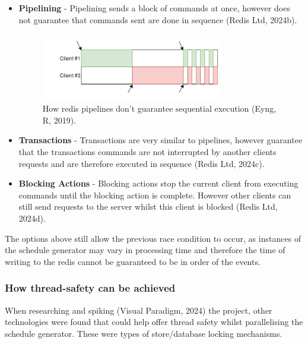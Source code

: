   \begin{itemize}
    \item \textbf{Pipelining} - Pipelining sends a block of commands at once, however does not guarantee that commands sent are done in sequence 
    (Redis Ltd, 2024b).
    \begin{figure}[H]
      \centering
      \includegraphics[width=8cm]{assets/pipelineOrdering.png}
      \caption{How redis pipelines don't guarantee sequential execution (Eyng, R, 2019).}
      \label{fig:pipelineOrdering}
    \end{figure}
    \item \textbf{Transactions} - Transactions are very similar to pipelines, however guarantee that the transactions commands are not interrupted by another
    clients requests and are therefore executed in sequence (Redis Ltd, 2024c).
    \item \textbf{Blocking Actions} - Blocking actions stop the current client from executing commands until the blocking action is complete. However other 
    clients can still send requests to the server whilst this client is blocked (Redis Ltd, 2024d). 
  \end{itemize}

  The options above still allow the previous race condition to occur, as instances of the schedule generator may vary in processing time and therefore the 
  time of writing to the redis cannot be guaranteed to be in order of the events.

  \subsubsection{How thread-safety can be achieved}
  When researching and spiking (Visual Paradigm, 2024) the project, other technologies were found that could help offer thread safety whilst parallelising
  the schedule generator. These were types of store/database locking mechanisms.

